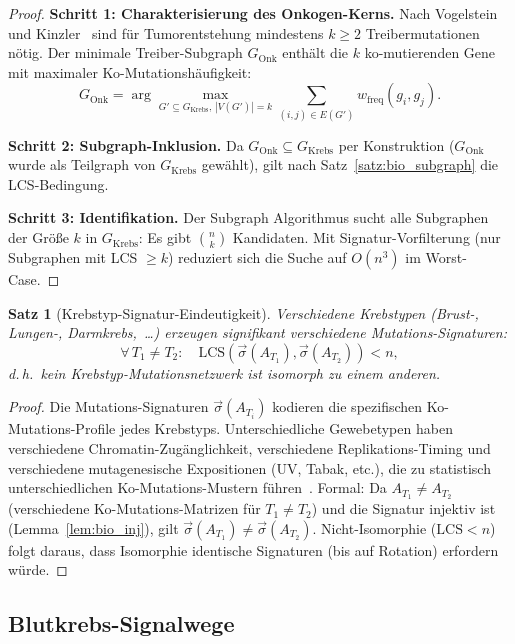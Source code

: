 ﻿\documentclass[a4paper,12pt]{article}
\theoremstyle{plain}
\newtheorem{satz}{Satz}
\theoremstyle{definition}
\theoremstyle{remark}
\newcommand{\Gkrebs}{G_{\mathrm{Krebs}}}
\newcommand{\sigvec}{\vec{\sigma}}
\begin{document}
\begin{proof}
\textbf{Schritt 1: Charakterisierung des Onkogen-Kerns.}
Nach Vogelstein und Kinzler~\cite{vogelstein2004} sind f\"ur Tumorentstehung
mindestens $k \geq 2$ Treibermutationen n\"otig.
Der minimale Treiber-Subgraph $G_{\mathrm{Onk}}$ enth\"alt die
$k$ ko-mutierenden Gene mit maximaler Ko-Mutationsh\"aufigkeit:
\[
G_{\mathrm{Onk}} = \arg\max_{G' \subseteq \Gkrebs,\,|V(G')| = k}
\sum_{(i,j) \in E(G')} w_{\mathrm{freq}}(g_i, g_j).
\]

\textbf{Schritt 2: Subgraph-Inklusion.}
Da $G_{\mathrm{Onk}} \subseteq \Gkrebs$ per Konstruktion
($G_{\mathrm{Onk}}$ wurde als Teilgraph von $\Gkrebs$ gew\"ahlt),
gilt nach Satz~\ref{satz:bio_subgraph} die LCS-Bedingung.

\textbf{Schritt 3: Identifikation.}
Der Subgraph Algorithmus sucht alle Subgraphen der Gr\"o{\ss}e $k$
in $\Gkrebs$: Es gibt $\binom{n}{k}$ Kandidaten. Mit Signatur-Vorfilterung
(nur Subgraphen mit LCS $\geq k$) reduziert sich die Suche auf
$O(n^3)$ im Worst-Case.
\end{proof}

\begin{satz}[Krebstyp-Signatur-Eindeutigkeit]
\label{satz:krebs_sig}
Verschiedene Krebstypen (Brust-, Lungen-, Darmkrebs,\ \ldots) erzeugen
signifikant verschiedene Mutations-Signaturen:
\[
\forall\, T_1 \neq T_2:\quad
\mathrm{LCS}\!\left(\sigvec(A_{T_1}), \sigvec(A_{T_2})\right) < n,
\]
d.\,h.\ kein Krebstyp-Mutationsnetzwerk ist isomorph zu einem anderen.
\end{satz}

\begin{proof}
Die Mutations-Signaturen $\sigvec(A_{T_i})$ kodieren die spezifischen
Ko-Mutations-Profile jedes Krebstyps.
Unterschiedliche Gewebetypen haben verschiedene Chromatin-Zug\"anglichkeit,
verschiedene Replikations-Timing und verschiedene mutagenesische Expositionen
(UV, Tabak, etc.), die zu statistisch unterschiedlichen Ko-Mutations-Mustern
f\"uhren~\cite{alexandrov2013}.
Formal: Da $A_{T_1} \neq A_{T_2}$ (verschiedene Ko-Mutations-Matrizen
f\"ur $T_1 \neq T_2$) und die Signatur injektiv ist (Lemma~\ref{lem:bio_inj}),
gilt $\sigvec(A_{T_1}) \neq \sigvec(A_{T_2})$.
Nicht-Isomorphie ($\mathrm{LCS} < n$) folgt daraus, dass Isomorphie
identische Signaturen (bis auf Rotation) erfordern w\"urde.
\end{proof}

\subsection{Blutkrebs-Signalwege}
\end{document}
